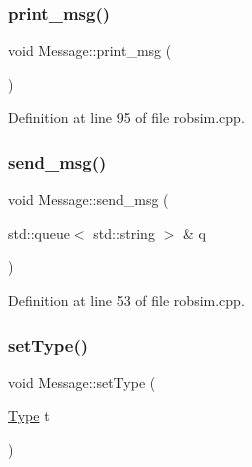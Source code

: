 \mbox{\label{classMessage_accae179a21fb486b5e830edf36f5cffc}} 
\subsubsection{\texorpdfstring{print\+\_\+msg()}{print\_msg()}}
{\footnotesize\ttfamily void Message\+::print\+\_\+msg (\begin{DoxyParamCaption}{ }\end{DoxyParamCaption})}



Definition at line 95 of file robsim.\+cpp.

\mbox{\label{classMessage_a861344493c976ef1de90df8b464f36af}} 
\subsubsection{\texorpdfstring{send\+\_\+msg()}{send\_msg()}}
{\footnotesize\ttfamily void Message\+::send\+\_\+msg (\begin{DoxyParamCaption}\item[{std\+::queue$<$ std\+::string $>$ \&}]{q }\end{DoxyParamCaption})}



Definition at line 53 of file robsim.\+cpp.

\mbox{\label{classMessage_acaa0b0c246dfbdd5c929911b27752b5c}} 
\subsubsection{\texorpdfstring{set\+Type()}{setType()}}
{\footnotesize\ttfamily void Message\+::set\+Type (\begin{DoxyParamCaption}\item[{\hyperlink{classMessage_a1c65ab3f02ba5b175f583f9d275ecf2b}{Type}}]{t }\end{DoxyParamCaption})\hspace{0.3cm}{\ttfamily [inline]}}



